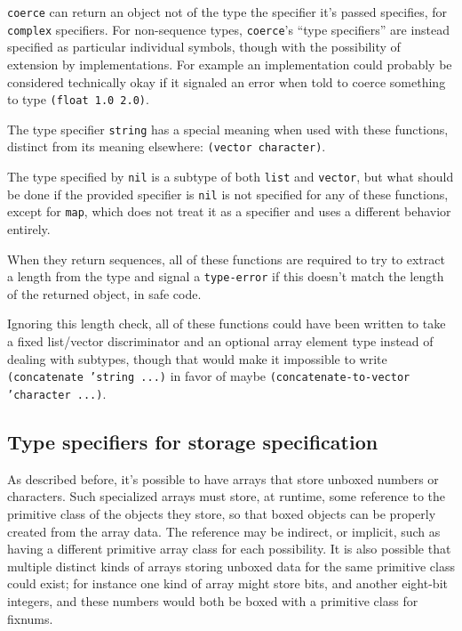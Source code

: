 \documentclass{article}
\begin{document}
\texttt{coerce} can return an object not of the type the specifier it's passed specifies, for \texttt{complex} specifiers. For non-sequence types, \texttt{coerce}'s ``type specifiers'' are instead specified as particular individual symbols, though with the possibility of extension by implementations. For example an implementation could probably be considered technically okay if it signaled an error when told to coerce something to type \texttt{(float 1.0 2.0)}.

The type specifier \texttt{string} has a special meaning when used with these functions, distinct from its meaning elsewhere: \texttt{(vector character)}.

The type specified by \texttt{nil} is a subtype of both \texttt{list} and \texttt{vector}, but what should be done if the provided specifier is \texttt{nil} is not specified for any of these functions, except for \texttt{map}, which does not treat it as a specifier and uses a different behavior entirely.

When they return sequences, all of these functions are required to try to extract a length from the type and signal a \texttt{type-error} if this doesn't match the length of the returned object, in safe code.

Ignoring this length check, all of these functions could have been written to take a fixed list/vector discriminator and an optional array element type instead of dealing with subtypes, though that would make it impossible to write \texttt{(concatenate 'string ...)} in favor of maybe \texttt{(concatenate-to-vector 'character ...)}.


\subsection{Type specifiers for storage specification}

As described before, it's possible to have arrays that store unboxed numbers or characters. Such specialized arrays must store, at runtime, some reference to the primitive class of the objects they store, so that boxed objects can be properly created from the array data. The reference may be indirect, or implicit, such as having a different primitive array class for each possibility. It is also possible that multiple distinct kinds of arrays storing unboxed data for the same primitive class could exist; for instance one kind of array might store bits, and another eight-bit integers, and these numbers would both be boxed with a primitive class for fixnums.
\end{document}
